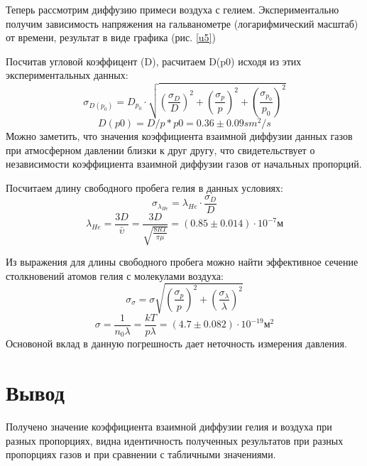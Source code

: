 \documentclass[a4paper,12pt]{article} %
\begin{document}
Теперь рассмотрим диффузию примеси воздуха с гелием. Экспериментально получим зависимость напряжения на гальванометре (логарифмический масштаб) от времени, результат в виде графика (рис. \ref{u5})


Посчитав угловой коэффицент (D), расчитаем D(p0) исходя из этих экспериментальных данных:
\begin{equation}
\sigma_{D(p_0)}=D_{p_0}\cdot \sqrt{(\frac{\sigma_D}{D})^2+(\frac{\sigma_p}{p})^2+(\frac{\sigma_{p_0}}{p_0})^2}
\end{equation}
\begin{equation}
D(p0)=D/p*p0 = 0.36 \pm 0.09 sm^2/s
\end{equation}
Можно заметить, что значения коэффициента взаимной диффузии данных газов при атмосферном давлении близки к друг другу, что свидетельствует о независимости коэффициента взаимной диффузии газов от начальных пропорций.

Посчитаем длину свободного пробега гелия в данных условиях:
\begin{equation}
\sigma_{\lambda_{He}} = \lambda_{He}\cdot \frac{\sigma_D}{D}
\end{equation}
\begin{equation}
\lambda_{He} = \frac{3D}{\bar{\upsilon}} = \frac{3D}{\sqrt{\frac{8RT}{\pi \mu}}}= ( 0.85 \pm 0.014 ) \cdot 10^{-7} \text{м}
\end{equation}

Из выражения для длины свободного пробега можно найти эффективное сечение столкновений атомов гелия с молекулами воздуха:
\begin{equation}
\sigma_\sigma = \sigma \sqrt{(\frac{\sigma_p}{p})^2+(\frac{\sigma_\lambda}{\lambda})^2}
\end{equation}
\begin{equation}
\sigma = \frac{1}{n_0\lambda} = \frac{kT}{p\lambda}= ( 4.7 \pm 0.082 ) \cdot 10^{-19} \text{м}^2
\end{equation}
Основоной вклад в данную погрешность дает неточность измерения давления.


\section{Вывод}
Получено значение коэффициента взаимной диффузии гелия и воздуха при разных пропорциях, видна идентичность полученных результатов при разных пропорциях газов и при сравнении с табличными значениями.
\end{document}
